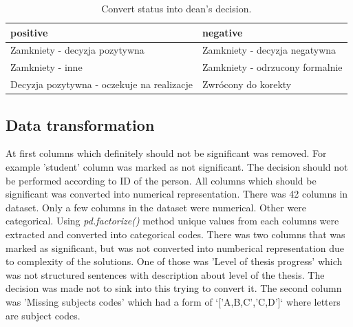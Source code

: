 \begin{table}
    \caption{Convert status into dean's decision.}
    \label{table:positive_negative}
    \begin{tabular}{|p{}|p{}|}
        \hline
            \textbf{positive} & \textbf{negative} \\
        \hline
            Zamkniety - decyzja pozytywna & Zamkniety - decyzja negatywna \\ 
        \hline
            Zamkniety - inne & Zamkniety - odrzucony formalnie \\
        \hline
            Decyzja pozytywna - oczekuje na realizacje & Zwrócony do korekty \\
        \hline
        
    \end{tabular}
    
\end{table}


\subsection{Data transformation}
At first columns which definitely should not be significant was removed. For example 'student' column was marked as not significant. The decision should not be performed according to ID of the person. All columns which should be significant was converted into numerical representation.
There was 42 columns in dataset. Only a few columns in the dataset were numerical. Other were categorical. Using \textit{pd.factorize()} method unique values from each columns were extracted and converted into categorical codes.
There was two columns that was marked as significant, but was not converted into numberical representation due to complexity of the solutions. One of those was 'Level of thesis progress' which was not structured sentences with description about level of the thesis. The decision was made not to sink into this trying to convert it. The second column was 'Missing subjects codes' which had a form of `['A,B,C','C,D']` where letters are subject codes.
